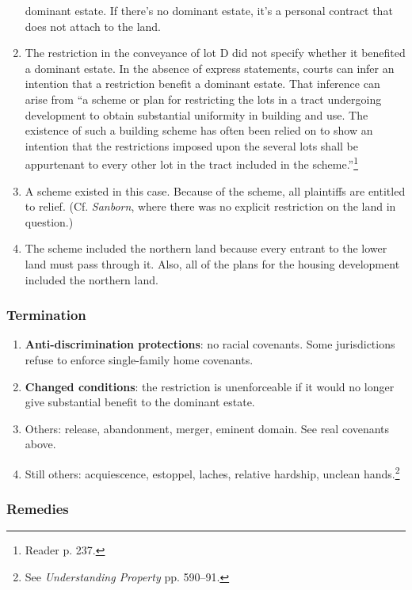 \begin{enumerate}
    dominant estate. If there's no dominant estate, it's a personal contract 
    that does not attach to the land.
    \item The restriction in the conveyance of lot D did not specify whether 
    it benefited a dominant estate. In the absence of express statements, 
    courts can infer an intention that a restriction benefit a dominant 
    estate. That inference can arise from ``a scheme or plan for restricting 
    the lots in a tract undergoing development to obtain substantial 
    uniformity in building and use. The existence of such a building scheme 
    has often been relied on to show an intention that the restrictions 
    imposed upon the several lots shall be appurtenant to every other lot in 
    the tract included in the scheme.''\footnote{Reader p. 237.}
    \item A scheme existed in this case. Because of the scheme, all plaintiffs 
    are entitled to relief. (Cf. \emph{Sanborn}, where there was no explicit 
    restriction on the land in question.)
    \item The scheme included the northern land because every entrant to the 
    lower land must pass through it. Also, all of the plans for the housing 
    development included the northern land.
\end{enumerate}

\subsubsection{Termination}

\begin{enumerate}
    \item \textbf{Anti-discrimination protections}: no racial covenants. Some 
    jurisdictions refuse to enforce single-family home covenants.
    \item \textbf{Changed conditions}: the restriction is unenforceable if it 
    would no longer give substantial benefit to the dominant estate.
    \item Others: release, abandonment, merger, eminent domain. See real 
    covenants above.
    \item Still others: acquiescence, estoppel, laches, relative hardship, 
    unclean hands.\footnote{See \emph{Understanding Property} pp. 590--91.}
\end{enumerate}

\subsubsection{Remedies}

